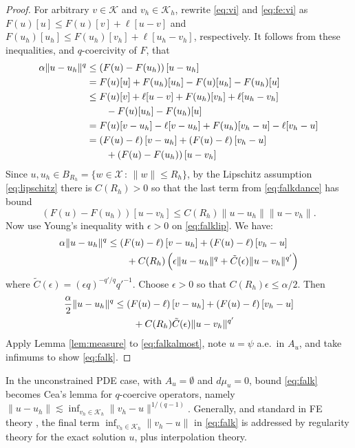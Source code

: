 \documentclass[]{interact}
\theoremstyle{plain}%
\theoremstyle{definition}
\theoremstyle{remark}
\newcommand{\eps}{\epsilon}
\newcommand{\cK}{\mathcal{K}}
\newcommand{\cX}{\mathcal{X}}
\begin{document}
\begin{proof}  For arbitrary $v\in\cK$ and $v_h\in\cK_h$, rewrite \eqref{eq:vi} and \eqref{eq:fe:vi} as $F(u)[u] \le F(u)[v] + \ell[u-v]$ and $F(u_h)[u_h] \le F(u_h)[v_h] + \ell[u_h-v_h]$, respectively.  It follows from these inequalities, and $q$-coercivity of $F$, that
\begin{align}
\alpha \|u-u_h\|^q &\le \left(F(u)-F(u_h)\right)[u-u_h] \label{eq:falkdance} \\
  &= F(u)[u] + F(u_h)[u_h] - F(u)[u_h] - F(u_h)[u] \notag \\
  &\le F(u)[v] + \ell[u-v] + F(u_h)[v_h] + \ell[u_h-v_h] \notag \\
  &\qquad - F(u)[u_h] - F(u_h)[u] \notag \\
  &= F(u)[v-u_h] - \ell[v-u_h] + F(u_h)[v_h-u] - \ell[v_h-u] \notag \\
  &= \left(F(u)-\ell\right)[v-u_h] + \left(F(u)-\ell\right)[v_h-u] \notag \\
  &\qquad + \left(F(u)-F(u_h)\right)[u-v_h] \notag
\end{align}
Since $u,u_h\in B_{R_h} = \{w\in\cX\,:\,\|w\|\le R_h\}$, by the Lipschitz assumption \eqref{eq:lipschitz} there is $C(R_h)>0$ so that the last term from \eqref{eq:falkdance} has bound
\begin{equation}
\left(F(u)-F(u_h)\right)[u-v_h] \le C(R_h) \|u-u_h\|\|u-v_h\|. \label{eq:falklip}
\end{equation}
Now use Young's inequality with $\eps>0$ \cite[Appendix B.2]{Evans2010} on \eqref{eq:falklip}.  We have:
\begin{align}
\alpha \|u-u_h\|^q &\le \left(F(u)-\ell\right)[v-u_h] + \left(F(u)-\ell\right)[v_h-u]  \label{eq:falkyoung} \\
  &\qquad + C(R_h) \left(\eps\|u-u_h\|^q + \tilde C(\eps) \|u-v_h\|^{q'}\right) \notag
\end{align}
where $\tilde C(\eps) = (\eps q)^{-q'/q} {q'}^{-1}$.  Choose $\eps>0$ so that $C(R_h) \eps \le \alpha/2$.  Then
\begin{align}
\frac{\alpha}{2} \|u-u_h\|^q &\le \left(F(u)-\ell\right)[v-u_h] + \left(F(u)-\ell\right)[v_h-u]  \label{eq:falkalmost} \\
  &\qquad + C(R_h) \tilde C(\eps) \|u-v_h\|^{q'} \notag
\end{align}
Apply Lemma \ref{lem:measure} to \eqref{eq:falkalmost}, note $u=\psi$ a.e.~in $A_u$, and take infimums to show \eqref{eq:falk}.\end{proof}

In the unconstrained PDE case, with $A_u=\emptyset$ and $d\mu_u=0$, bound \eqref{eq:falk} becomes Cea's lemma for $q$-coercive operators, namely $\|u-u_h\| \lesssim \inf_{v_h\in\cK_h} \|v_h - u\|^{1/(q-1)}$.  Generally, and standard in FE theory \cite{AinsworthOden2000,ElmanSilvesterWathen2014}, the final term $\inf_{v_h\in\cK_h} \|v_h - u\|$ in  \eqref{eq:falk} is addressed by regularity theory for the exact solution $u$, plus interpolation theory.
\end{document}
